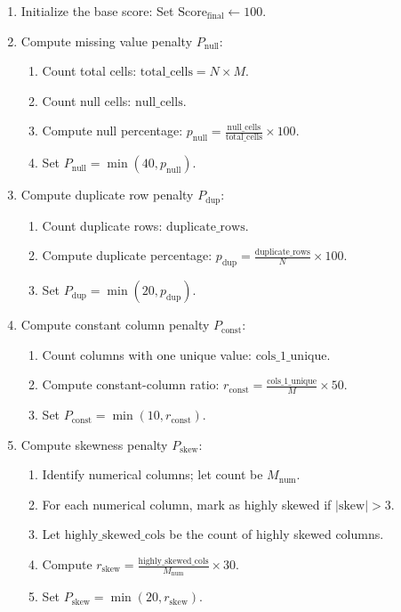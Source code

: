 \documentclass[conference]{IEEEtran}
\begin{document}
\begin{enumerate}
  \item Initialize the base score: Set $\text{Score}_{\text{final}} \leftarrow 100$.
  
  \item Compute missing value penalty $P_{\text{null}}$:
  \begin{enumerate}
    \item Count total cells: $\text{total\_cells} = N \times M$.
    \item Count null cells: $\text{null\_cells}$.
    \item Compute null percentage: $p_{\text{null}} = \frac{\text{null\_cells}}{\text{total\_cells}} \times 100$.
    \item Set $P_{\text{null}} = \min(40, p_{\text{null}})$.
  \end{enumerate}

  \item Compute duplicate row penalty $P_{\text{dup}}$:
  \begin{enumerate}
    \item Count duplicate rows: $\text{duplicate\_rows}$.
    \item Compute duplicate percentage: $p_{\text{dup}} = \frac{\text{duplicate\_rows}}{N} \times 100$.
    \item Set $P_{\text{dup}} = \min(20, p_{\text{dup}})$.
  \end{enumerate}

  \item Compute constant column penalty $P_{\text{const}}$:
  \begin{enumerate}
    \item Count columns with one unique value: $\text{cols\_1\_unique}$.
    \item Compute constant-column ratio: $r_{\text{const}} = \frac{\text{cols\_1\_unique}}{M} \times 50$.
    \item Set $P_{\text{const}} = \min(10, r_{\text{const}})$.
  \end{enumerate}

  \item Compute skewness penalty $P_{\text{skew}}$:
  \begin{enumerate}
    \item Identify numerical columns; let count be $M_{\text{num}}$.
    \item For each numerical column, mark as highly skewed if $|\text{skew}| > 3$.
    \item Let $\text{highly\_skewed\_cols}$ be the count of highly skewed columns.
    \item Compute $r_{\text{skew}} = \frac{\text{highly\_skewed\_cols}}{M_{\text{num}}} \times 30$.
    \item Set $P_{\text{skew}} = \min(20, r_{\text{skew}})$.
  \end{enumerate}


\end{enumerate}
\end{document}

